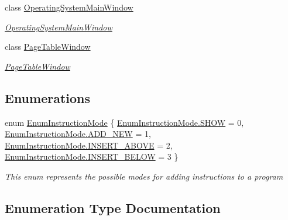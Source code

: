 \begin{DoxyCompactItemize}
class \hyperlink{class_c_p_u___o_s___simulator_1_1_operating_system_main_window}{Operating\+System\+Main\+Window}
\begin{DoxyCompactList}\small\item\em \hyperlink{class_c_p_u___o_s___simulator_1_1_operating_system_main_window}{Operating\+System\+Main\+Window} \end{DoxyCompactList}\item 
class \hyperlink{class_c_p_u___o_s___simulator_1_1_page_table_window}{Page\+Table\+Window}
\begin{DoxyCompactList}\small\item\em \hyperlink{class_c_p_u___o_s___simulator_1_1_page_table_window}{Page\+Table\+Window} \end{DoxyCompactList}\end{DoxyCompactItemize}
\subsection*{Enumerations}
\begin{DoxyCompactItemize}
\item 
enum \hyperlink{namespace_c_p_u___o_s___simulator_adc17a5a5e004084f05dc8e4d3f70e31f}{Enum\+Instruction\+Mode} \{ \hyperlink{namespace_c_p_u___o_s___simulator_adc17a5a5e004084f05dc8e4d3f70e31fac34fbad9a5e2a1d0c8f7cf8d226808b9}{Enum\+Instruction\+Mode.\+S\+H\+O\+W} = 0, 
\hyperlink{namespace_c_p_u___o_s___simulator_adc17a5a5e004084f05dc8e4d3f70e31faee3564492739daa789b12c0b8a2e6a25}{Enum\+Instruction\+Mode.\+A\+D\+D\+\_\+\+N\+E\+W} = 1, 
\hyperlink{namespace_c_p_u___o_s___simulator_adc17a5a5e004084f05dc8e4d3f70e31fa956b44f941eb5917f3cfcf0ba56db19b}{Enum\+Instruction\+Mode.\+I\+N\+S\+E\+R\+T\+\_\+\+A\+B\+O\+V\+E} = 2, 
\hyperlink{namespace_c_p_u___o_s___simulator_adc17a5a5e004084f05dc8e4d3f70e31fa0310160f3dc4ecec481c20ca1cf88be3}{Enum\+Instruction\+Mode.\+I\+N\+S\+E\+R\+T\+\_\+\+B\+E\+L\+O\+W} = 3
 \}\begin{DoxyCompactList}\small\item\em This enum represents the possible modes for adding instructions to a program \end{DoxyCompactList}
\end{DoxyCompactItemize}


\subsection{Enumeration Type Documentation}
\hypertarget{namespace_c_p_u___o_s___simulator_adc17a5a5e004084f05dc8e4d3f70e31f}{}
